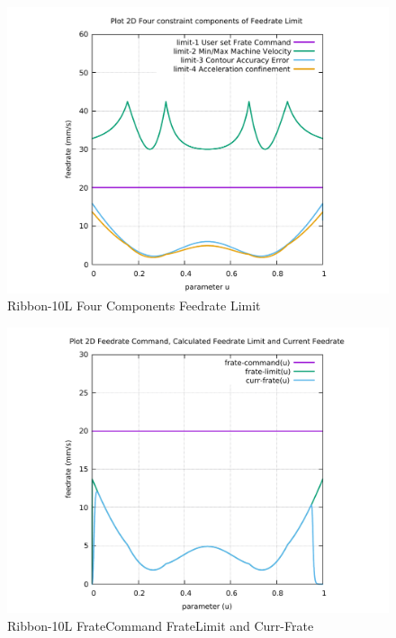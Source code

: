 \begin{figure}
	\caption     {Ribbon-10L Four Components Feedrate Limit}
	\label{10-img-Ribbon-10L-Four-Components-Feedrate-Limit.pdf}
	\includegraphics[width=1.00\textwidth]{Chap4/appendix/app-Ribbon-10L/plots/10-img-Ribbon-10L-Four-Components-Feedrate-Limit.pdf}
\end{figure}

\clearpage
\pagebreak

\begin{figure}
	\caption     {Ribbon-10L FrateCommand FrateLimit and Curr-Frate}
	\label{11-img-Ribbon-10L-FrateCommand-FrateLimit-and-Curr-Frate.pdf}
	\includegraphics[width=1.00\textwidth]{Chap4/appendix/app-Ribbon-10L/plots/11-img-Ribbon-10L-FrateCommand-FrateLimit-and-Curr-Frate.pdf}
\end{figure}

